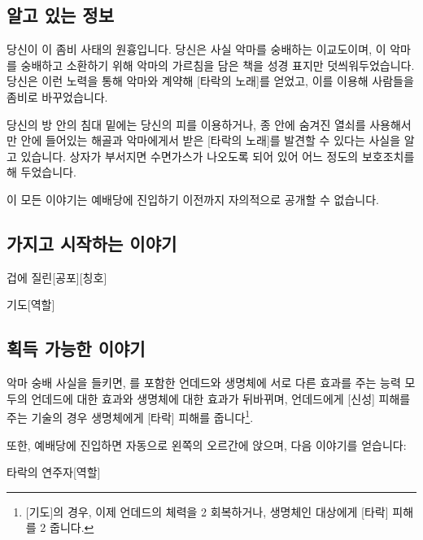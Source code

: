 \documentclass{report}
\begin{document}
	\subsection*{알고 있는 정보}
		당신이 이 좀비 사태의 원흉입니다. 당신은 사실 악마를 숭배하는 이교도이며, 이 악마를 숭배하고 소환하기 위해 악마의 가르침을 담은 책을 성경 표지만 덧씌워두었습니다. 당신은 이런 노력을 통해 악마와 계약해 [타락의 노래]를 얻었고, 이를 이용해 사람들을 좀비로 바꾸었습니다.
		
		당신의 방 안의 침대 밑에는 당신의 피를 이용하거나, 종 안에 숨겨진 열쇠를 사용해서만 안에 들어있는 해골과 악마에게서 받은 [타락의 노래]를 발견할 수 있다는 사실을 알고 있습니다. 상자가 부서지면 수면가스가 나오도록 되어 있어 어느 정도의 보호조치를 해 두었습니다.
		
		이 모든 이야기는 예배당에 진입하기 이전까지 자의적으로 공개할 수 없습니다.
	
	\subsection*{가지고 시작하는 이야기}
		\begin{spoiler}{겁에 질린}{[공포][칭호]}
			
		\end{spoiler}
		
		\begin{spoiler}{기도}{[역할]}
		\end{spoiler}
	
	\subsection*{획득 가능한 이야기}
		악마 숭배 사실을 들키면, 를 포함한 언데드와 생명체에 서로 다른 효과를 주는 능력 모두의 언데드에 대한 효과와 생명체에 대한 효과가 뒤바뀌며, 언데드에게 [신성] 피해를 주는 기술의 경우 생명체에게 [타락] 피해를 줍니다\footnote{[기도]의 경우, 이제 언데드의 체력을 2 회복하거나, 생명체인 대상에게 [타락] 피해를 2 줍니다.}.
		
		또한, 예배당에 진입하면 자동으로 왼쪽의 오르간에 앉으며, 다음 이야기를 얻습니다:
		\begin{spoiler}{타락의 연주자}{[역할]}
			
			
		\end{spoiler}
\end{document}
